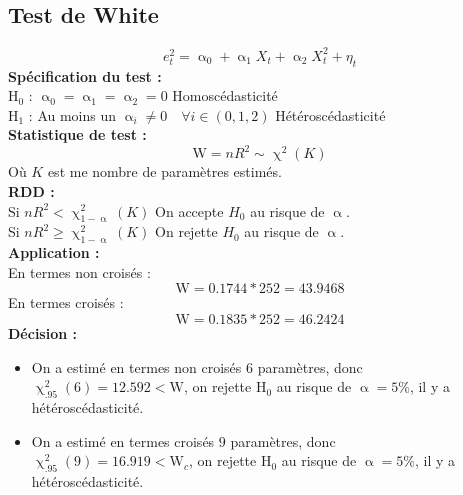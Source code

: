 \documentclass[A4paper]{article}
\begin{document}
\subsection{Test de White}
\begin{equation*}
		e_t^2 = \upalpha_0 + \upalpha_1 X_t + \upalpha_2 X_t^2 + \eta_t
\end{equation*}
\textbf{Spécification du test :} \\
H$_0$ : $\upalpha_0 = \upalpha_1 =\upalpha_2 = 0$ Homoscédasticité \\
H$_1$ : Au moins un $\upalpha_i \neq 0 \quad \forall i \in (0,1,2)$ Hétéroscédasticité \\
\textbf{Statistique de test :}
\begin{equation*}
		\text{W} = nR^2 \sim \upchi^2(K)
\end{equation*}
Où $K$ est me nombre de paramètres estimés.\\
\textbf{RDD : }\\
Si $nR^2 < \upchi^2_{1-\upalpha}(K)$ On accepte $H_0$ au risque de $\upalpha$.\\
Si $nR^2 \geq \upchi^2_{1-\upalpha}(K)$ On rejette $H_0$ au risque de $\upalpha$.\\
\textbf{Application : }\\
En termes non croisés :
\begin{equation*}
	\text{W} = 0.1744 * 252 = 43.9468
\end{equation*}
En termes croisés :
\begin{equation*}
	\text{W} = 0.1835 * 252 = 46.2424
\end{equation*}
\textbf{Décision :}\\
\begin{itemize}	
	\item On a estimé en termes non croisés $6$ paramètres, donc \\
	$\upchi^2_{.95}(6)=12.592 < \text{W}$, on rejette H$_0$ au risque de $\upalpha = 5\%$, il y a hétéroscédasticité.
	\item On a estimé en termes croisés $9$ paramètres, donc \\
	$\upchi^2_{.95}(9)=16.919 < \text{W}_c$, on rejette H$_0$ au risque de $\upalpha = 5\%$, il y a hétéroscédasticité.
\end{itemize}
\newpage
\end{document}
